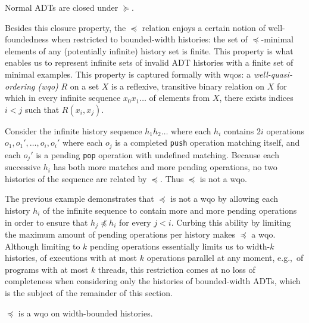 \begin{lemma}
  \label{lem:ADT_closure}

  Normal ADTs are closed under $\succeq$.

\end{lemma}

Besides this closure property, the $\preceq$ relation enjoys a certain notion of
well-foundedness when restricted to bounded-width histories: the set of
$\preceq$-minimal elements of any (potentially infinite) history set is finite.
This property is what enables us to represent infinite sets of invalid ADT
histories with a finite set of minimal examples. This property is captured
formally with wqos: a \emph{well-quasi-ordering (wqo)} $R$ on a set $X$ is a
reflexive, transitive binary relation on $X$ for which in every infinite
sequence $x_0 x_1 \ldots$ of elements from $X$, there exists indices $i < j$
such that $R(x_i,x_j)$.

\begin{example}

  Consider the infinite history sequence $h_1 h_2 \ldots$ where each $h_i$
  contains $2i$ operations $o_1, o_1', \ldots, o_i, o_i'$ where each $o_j$ is a
  completed {\tt push} operation matching itself, and each $o_j'$ is a pending
  {\tt pop} operation with undefined matching. Because each successive $h_i$
  has both more matches and more pending operations, no two histories of the
  sequence are related by $\preceq$. Thus $\preceq$ is not a wqo.

\end{example}

The previous example demonstrates that $\preceq$ is not a wqo by allowing each
history $h_i$ of the infinite sequence to contain more and more pending
operations in order to ensure that $h_j \not\preceq h_i$ for every $j < i$.
Curbing this ability by limiting the maximum amount of pending operations per
history makes $\preceq$ a wqo. Although limiting to $k$ pending operations
essentially limits us to width-$k$ histories, of executions with at most $k$
operations parallel at any moment, e.g.,~of programs with at most $k$ threads,
this restriction comes at no loss of completeness when considering only the
histories of bounded-width ADTs, which is the subject of the remainder
of this section.

\begin{lemma}
  \label{lem:wqo}

  $\preceq$ is a wqo on width-bounded histories.

\end{lemma}

